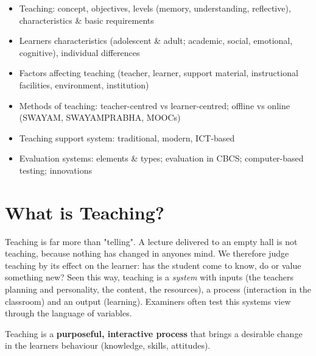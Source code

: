 

\begin{sylbox}

\begin{itemize}
\tightlist
\item[$\square$]
  Teaching: concept, objectives, levels (memory, understanding, reflective), characteristics \& basic requirements
\item[$\square$]
  Learner\textquotesingle s characteristics (adolescent \& adult; academic, social, emotional, cognitive), individual differences
\item[$\square$]
  Factors affecting teaching (teacher, learner, support material, instructional facilities, environment, institution)
\item[$\square$]
  Methods of teaching: teacher-centred vs learner-centred; offline vs online (SWAYAM, SWAYAMPRABHA, MOOCs)
\item[$\square$]
  Teaching support system: traditional, modern, ICT-based
\item[$\square$]
  Evaluation systems: elements \& types; evaluation in CBCS; computer-based testing; innovations
\end{itemize}

\end{sylbox}

\needspace{155pt}

\hypertarget{p1-01--1-what-is-teaching}{%
\section{What is Teaching?}\label{p1-01--1-what-is-teaching}}

Teaching is far more than "telling". A lecture delivered to an empty hall is not teaching, because nothing has
changed in anyone\textquotesingle s mind. We therefore judge teaching by its effect on the learner: has the student come to
know, do or value something new? Seen this way, teaching is a \emph{system} with inputs (the teacher\textquotesingle s planning
and personality, the content, the resources), a process (interaction in the classroom) and an output
(learning). Examiners often test this systems view through the language of variables.

Teaching is a \textbf{purposeful, interactive process} that brings a desirable change in the learner\textquotesingle s behaviour
(knowledge, skills, attitudes).

